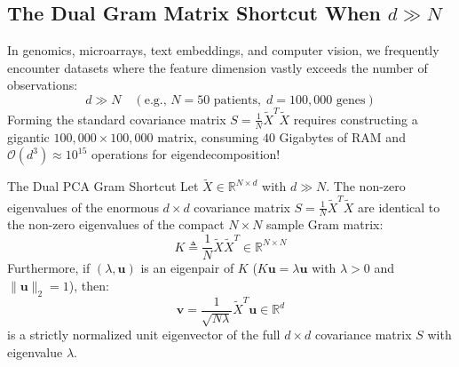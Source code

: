 \subsection{The Dual Gram Matrix Shortcut When \texorpdfstring{$d \gg N$}{d >> N}}
In genomics, microarrays, text embeddings, and computer vision, we frequently encounter datasets where the feature dimension vastly exceeds the number of observations:
\begin{equation}
d \gg N \quad (\text{e.g., } N = 50 \text{ patients}, \; d = 100{,}000 \text{ genes})
\end{equation}
Forming the standard covariance matrix $S = \frac{1}{N}\tilde{X}^T \tilde{X}$ requires constructing a gigantic $100{,}000 \times 100{,}000$ matrix, consuming $40$ Gigabytes of RAM and $\mathcal{O}(d^3) \approx 10^{15}$ operations for eigendecomposition!

\begin{theorembox}{The Dual PCA Gram Shortcut}
Let $\tilde{X} \in \mathbb{R}^{N \times d}$ with $d \gg N$. The non-zero eigenvalues of the enormous $d \times d$ covariance matrix $S = \frac{1}{N}\tilde{X}^T \tilde{X}$ are identical to the non-zero eigenvalues of the compact $N \times N$ sample Gram matrix:
\begin{equation}
K \triangleq \frac{1}{N}\tilde{X}\tilde{X}^T \in \mathbb{R}^{N \times N}
\label{eq:dual_gram_matrix}
\end{equation}
Furthermore, if $(\lambda, \mathbf{u})$ is an eigenpair of $K$ ($K\mathbf{u} = \lambda \mathbf{u}$ with $\lambda > 0$ and $\|\mathbf{u}\|_2 = 1$), then:
\begin{equation}
\mathbf{v} = \frac{1}{\sqrt{N\lambda}} \tilde{X}^T \mathbf{u} \in \mathbb{R}^d
\label{eq:dual_v_reconstruction}
\end{equation}
is a strictly normalized unit eigenvector of the full $d \times d$ covariance matrix $S$ with eigenvalue $\lambda$.
\end{theorembox}

